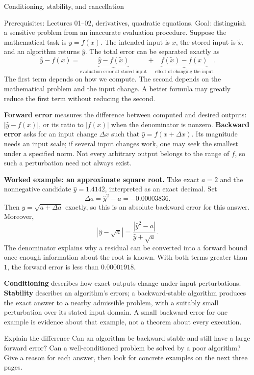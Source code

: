 \def\lecturenumber{03}


\opening{Conditioning, stability, and cancellation}{Prerequisites: Lectures 01--02, derivatives, quadratic equations.\newline
Goal: distinguish a sensitive problem from an inaccurate evaluation procedure.}
Suppose the mathematical task is $y=f(x)$. The intended input is $x$, the stored
input is $\widetilde x$, and an algorithm returns $\widehat y$. The total error
can be separated exactly as
\[
 \widehat y-f(x)=
 \underbrace{\widehat y-f(\widetilde x)}_{\text{evaluation error at stored input}}
 +\underbrace{f(\widetilde x)-f(x)}_{\text{effect of changing the input}}.
\]
The first term depends on how we compute. The second depends on the mathematical
problem and the input change. A better formula may greatly reduce the first term
without reducing the second.

\textbf{Forward error} measures the difference between computed and desired outputs:
$|\widehat y-f(x)|$, or its ratio to $|f(x)|$ when the denominator is nonzero.
\textbf{Backward error} asks for an input change $\Delta x$ such that
$\widehat y=f(x+\Delta x)$. Its magnitude needs an input scale; if several input
changes work, one may seek the smallest under a specified norm. Not every arbitrary
output belongs to the range of $f$, so such a perturbation need not always exist.

\textbf{Worked example: an approximate square root.} Take exact $a=2$ and the
nonnegative candidate $\widehat y=1.4142$, interpreted as an exact decimal. Set
\[
 \Delta a=\widehat y^2-a=-0.00003836.
\]
Then $\widehat y=\sqrt{a+\Delta a}$ exactly, so this is an absolute backward
error for this answer. Moreover,
\[
 |\widehat y-\sqrt a|
 =\frac{|\widehat y^2-a|}{\widehat y+\sqrt a}.
\]
The denominator explains why a residual can be converted into a forward bound
once enough information about the root is known. With both terms greater than
$1$, the forward error is less than $0.00001918$.

\textbf{Conditioning} describes how exact outputs change under input perturbations.
\textbf{Stability} describes an algorithm's errors; a backward-stable algorithm
produces the exact answer to a nearby admissible problem, with a suitably small
perturbation over its stated input domain. A small backward error for one example
is evidence about that example, not a theorem about every execution.
\begin{question}{Explain the difference}
Can an algorithm be backward stable and still have a large forward error?
Can a well-conditioned problem be solved by a poor algorithm? Give a reason for
each answer, then look for concrete examples on the next three pages.
\end{question}

